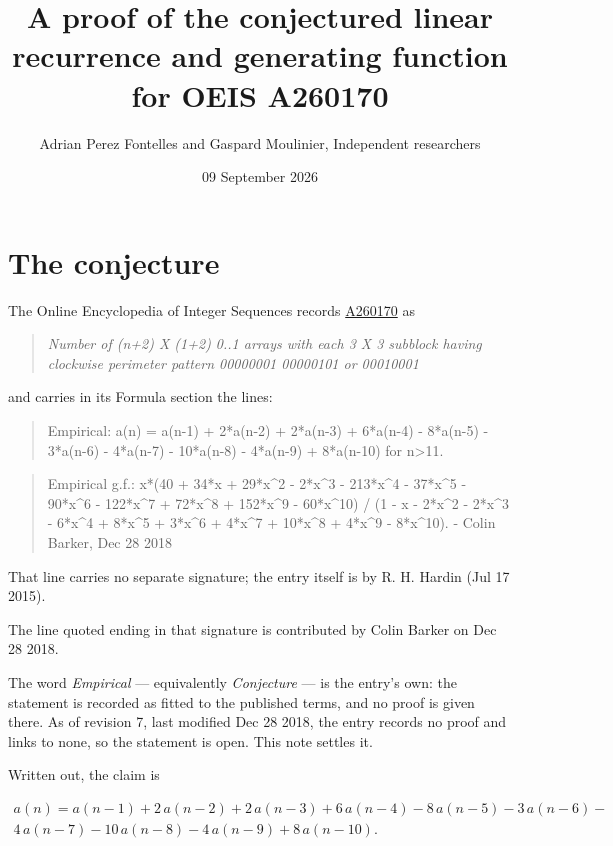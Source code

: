 \documentclass[11pt]{article}
\title{A proof of the conjectured linear recurrence and generating function for OEIS A260170}
\author{Adrian Perez Fontelles and Gaspard Moulinier, Independent researchers}
\date{09 September 2026}
\theoremstyle{definition}
\begin{document}
\maketitle
\section{The conjecture}

The Online Encyclopedia of Integer Sequences records \href{https://oeis.org/A260170}{A260170} as

\begin{quote}\itshape Number of (n+2) X (1+2) 0..1 arrays with each 3 X 3 subblock having clockwise perimeter pattern 00000001 00000101 or 00010001\end{quote}

and carries in its Formula section the lines:

\begin{quote}\ttfamily Empirical: a(n) = a(n-1) + 2*a(n-2) + 2*a(n-3) + 6*a(n-4) - 8*a(n-5) - 3*a(n-6) - 4*a(n-7) - 10*a(n-8) - 4*a(n-9) + 8*a(n-10) for n>11.\end{quote}

\begin{quote}\ttfamily Empirical g.f.: x*(40 + 34*x + 29*x\textasciicircum{}2 - 2*x\textasciicircum{}3 - 213*x\textasciicircum{}4 - 37*x\textasciicircum{}5 - 90*x\textasciicircum{}6 - 122*x\textasciicircum{}7 + 72*x\textasciicircum{}8 + 152*x\textasciicircum{}9 - 60*x\textasciicircum{}10) / (1 - x - 2*x\textasciicircum{}2 - 2*x\textasciicircum{}3 - 6*x\textasciicircum{}4 + 8*x\textasciicircum{}5 + 3*x\textasciicircum{}6 + 4*x\textasciicircum{}7 + 10*x\textasciicircum{}8 + 4*x\textasciicircum{}9 - 8*x\textasciicircum{}10). - Colin Barker, Dec 28 2018\end{quote}

That line carries no separate signature; the entry itself is by R. H. Hardin (Jul 17 2015).

The line quoted ending in that signature is contributed by Colin Barker on Dec 28 2018.

The word {\itshape Empirical} --- equivalently {\itshape Conjecture} --- is the entry's own: the statement is recorded as fitted to the published terms, and no proof is given there. As of revision 7, last modified Dec 28 2018, the entry records no proof and links to none, so the statement is open. This note settles it.

Written out, the claim is

\begin{multline*} a(n) = a(n-1) + 2\,a(n-2) + 2\,a(n-3) + 6\,a(n-4) - 8\,a(n-5) - 3\,a(n-6) - \\ 4\,a(n-7) - 10\,a(n-8) - 4\,a(n-9) + 8\,a(n-10). \end{multline*}
\end{document}
